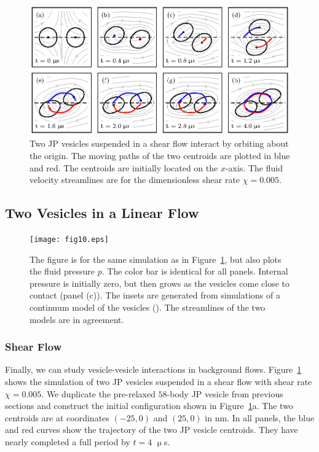 \documentclass[lineno]{jfm}
\begin{document}
\begin{figure}
  \begin{center}
\includegraphics[width=\textwidth]{fig9.eps}
\end{center} 
  \caption{\label{figure9} Two JP vesicles suspended in a shear flow
  interact by orbiting about the origin. The moving paths of the two
  centroids are plotted in blue and red. The centroids are initially
  located on the $x$-axis. The fluid velocity streamlines are for the dimensionless shear rate $\chi=0.005$.}
\end{figure}
\subsection{Two Vesicles in a Linear Flow}
\begin{figure}
  \centering
\texttt{[image: fig10.eps]}  
  \caption{\label{figure10} 
  The figure is for the same simulation as in Figure~\ref{figure9}, 
  but also plots the fluid pressure $p$. The color bar is identical for all panels. 
  Internal pressure is initially zero, but then grows as the vesicles come close to contact  (panel (c)).
  The insets are generated from simulations of a continuum model of the vesicles (\cite{qua-vee-you2019}). 
  The streamlines of the two models are in agreement.}
\end{figure}

\subsubsection{Shear Flow}
Finally, we can study vesicle-vesicle interactions in background flows. 
Figure~\ref{figure9} shows the simulation of two JP vesicles suspended
in a shear flow with shear rate $\chi=0.005$. We duplicate the
pre-relaxed $58$-body JP vesicle from previous sections and construct the
initial configuration shown in Figure~\ref{figure9}a. The two centroids
are at coordinates $(-25,0)$ and $(25,0)$ in nm. In all panels, the blue and red
curves show the trajectory of the two JP vesicle centroids. They have
nearly completed a full period by $t=4$ $\upmu$s. 
\end{document}
